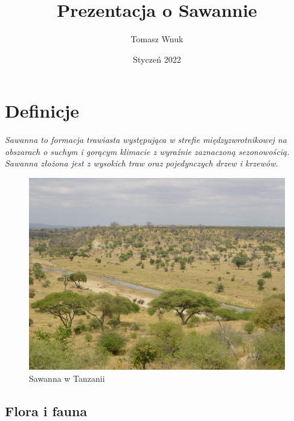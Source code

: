 \documentclass[14pt]{beamer}
\title{Prezentacja o Sawannie}
\author{Tomasz Wnuk}
\institute{Uniwersytet Marii Curie-Skłodowskiej}
\date{Styczeń 2022}
\begin{document}
\maketitle
\section{Definicje}

\begin{frame}{\color{black}{Co to jest sawanna?}}
    \begin{block}{\color{red}{O Sawannie}}
        \small  \textit{Sawanna to formacja trawiasta występująca w strefie międzyzwrotnikowej
        \small  na obszarach o suchym i gorącym klimacie z wyraźnie zaznaczoną
        \small  sezonowością. Sawanna złożona jest z wysokich traw oraz pojedynczych drzew i krzewów.}
    \end{block}
    \begin{figure}
        \centering
        \includegraphics[scale=0.1]{Sawanna_w_tanzanii.jpg}
        \caption{Sawanna w Tanzanii}
        \label{fig:my_label}
    \end{figure}
\end{frame}

\subsection{Flora i fauna}
\end{document}
